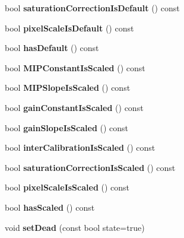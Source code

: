 \begin{DoxyCompactItemize}
\item 
bool {\bfseries saturation\-Correction\-Is\-Default} () const \label{classCALICE_1_1SiPMCalibrationStatusBits_ad2d4257f2d6692847108397fa5ffc098}

\item 
bool {\bfseries pixel\-Scale\-Is\-Default} () const \label{classCALICE_1_1SiPMCalibrationStatusBits_aa8829af954fcb9b5b3c3a35d4bb02321}

\item 
bool {\bfseries has\-Default} () const \label{classCALICE_1_1SiPMCalibrationStatusBits_ab2c1f6202330a29d229b30ddf740e23a}

\item 
bool {\bfseries M\-I\-P\-Constant\-Is\-Scaled} () const \label{classCALICE_1_1SiPMCalibrationStatusBits_a2c0d200fc62a7d19afc974fffaac0bbd}

\item 
bool {\bfseries M\-I\-P\-Slope\-Is\-Scaled} () const \label{classCALICE_1_1SiPMCalibrationStatusBits_a0bc64339f62fdd7034d12fbcc1bf10f0}

\item 
bool {\bfseries gain\-Constant\-Is\-Scaled} () const \label{classCALICE_1_1SiPMCalibrationStatusBits_a67ee173322903b66ab028315fc1b0e3d}

\item 
bool {\bfseries gain\-Slope\-Is\-Scaled} () const \label{classCALICE_1_1SiPMCalibrationStatusBits_a29717fb78eda7c911e5e1c6c99bce398}

\item 
bool {\bfseries inter\-Calibration\-Is\-Scaled} () const \label{classCALICE_1_1SiPMCalibrationStatusBits_a4667a09baf873f55145fbabebcb17ce9}

\item 
bool {\bfseries saturation\-Correction\-Is\-Scaled} () const \label{classCALICE_1_1SiPMCalibrationStatusBits_a09521e16e0877d280ef1a3d728aac8c2}

\item 
bool {\bfseries pixel\-Scale\-Is\-Scaled} () const \label{classCALICE_1_1SiPMCalibrationStatusBits_a531f616b398de3198c98c8ed8d51c235}

\item 
bool {\bfseries has\-Scaled} () const \label{classCALICE_1_1SiPMCalibrationStatusBits_a35d0873f53f47f39e3281b3b36a4e511}

\item 
void {\bfseries set\-Dead} (const bool state=true)\label{classCALICE_1_1SiPMCalibrationStatusBits_a6b2cde5c02bf673bab596b5e679d8400}


\end{DoxyCompactItemize}

